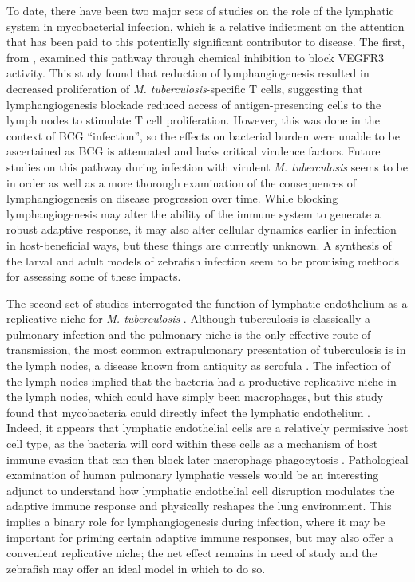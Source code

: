 To date, there have been two major sets of studies on the role of the lymphatic system in mycobacterial infection, which is a relative indictment on the attention that has been paid to this potentially significant contributor to disease. The first, from \citet{Harding2015}, examined this pathway through chemical inhibition to block VEGFR3 activity. This study found that reduction of lymphangiogenesis resulted in decreased proliferation of \textit{M. tuberculosis}\hyp{}specific T cells, suggesting that lymphangiogenesis blockade reduced access of antigen\hyp{}presenting cells to the lymph nodes to stimulate T cell proliferation. However, this was done in the context of BCG ``infection'', so the effects on bacterial burden were unable to be ascertained as BCG is attenuated and lacks critical virulence factors. Future studies on this pathway during infection with virulent \textit{M. tuberculosis} seems to be in order as well as a more thorough examination of the consequences of lymphangiogenesis on disease progression over time. While blocking lymphangiogenesis may alter the ability of the immune system to generate a robust adaptive response, it may also alter cellular dynamics earlier in infection in host\hyp{}beneficial ways, but these things are currently unknown. A synthesis of the larval and adult models of zebrafish infection seem to be promising methods for assessing some of these impacts.

The second set of studies interrogated the function of lymphatic endothelium as a replicative niche for \textit{M. tuberculosis} \citep{Lerner2016, Lerner2020}. Although tuberculosis is classically a pulmonary infection and the pulmonary niche is the only effective route of transmission, the most common extrapulmonary presentation of tuberculosis is in the lymph nodes, a disease known from antiquity as scrofula \citep{Bloch1973}. The infection of the lymph nodes implied that the bacteria had a productive replicative niche in the lymph nodes, which could have simply been macrophages, but this study found that mycobacteria could directly infect the lymphatic endothelium \citep{Lerner2016}. Indeed, it appears that lymphatic endothelial cells are a relatively permissive host cell type, as the bacteria will cord within these cells as a mechanism of host immune evasion that can then block later macrophage phagocytosis \citep{Lerner2020}. Pathological examination of human pulmonary lymphatic vessels would be an interesting adjunct to understand how lymphatic endothelial cell disruption modulates the adaptive immune response and physically reshapes the lung environment. This implies a binary role for lymphangiogenesis during infection, where it may be important for priming certain adaptive immune responses, but may also offer a convenient replicative niche; the net effect remains in need of study and the zebrafish may offer an ideal model in which to do so.

